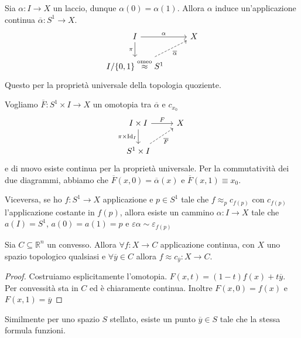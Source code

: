 \begin{proposition}
    Sia \(\alpha : I \to X\) un laccio, dunque \(\alpha{(0)} = \alpha{(1)}\).
    Allora \(\alpha\) induce un'applicazione continua \(\overline{\alpha} :
    S^{1} \to X\).
\[\begin{tikzcd}
	I & X \\
	{I/\{0,1\} \overset{\text{omeo}}{\approx} S^1}
	\arrow["\alpha", from=1-1, to=1-2]
	\arrow["\pi"', from=1-1, to=2-1]
	\arrow["{\overline{\alpha}}"', dashed, from=2-1, to=1-2]
\end{tikzcd}\]
Questo per la proprietà universale della topologia quoziente.

Vogliamo \(\overline{F} : S^{1}\times  I \to X\) un omotopia tra
\(\overline{\alpha}\) e \(c_{x_{0}} \) 
\[\begin{tikzcd}
	I \times I & X \\
	{S^1 \times I}
	\arrow["F", from=1-1, to=1-2]
	\arrow["\pi \times \mathrm{Id}_I"', from=1-1, to=2-1]
	\arrow["{\overline{F}}"', dashed, from=2-1, to=1-2]
\end{tikzcd}\]
e di nuovo esiste continua per la proprietà universale.
Per la commutatività dei due diagrammi, abbiamo che \(\overline{F}{(x, 0)} =
\overline{\alpha}{(x)}\) e \(\overline{F}{(x, 1)} \equiv x_{0}\).
\end{proposition}

\begin{proposition}
    Viceversa, 
    se ho \(f: S^{1} \to X\) applicazione e \(p \in S^{1}\) tale che \(f
    \approx_p c_{f{(p)}} \) con \(c_{f{(p)}} \) l'applicazione costante in
    \(f{(p)}\), allora esiste un cammino \(\alpha : I \to X\) tale che \(a{(I)}
    = S^{1}\), \(a{(0)}= a{(1)} = p\) e \(\varepsilon \alpha \sim
    \varepsilon_{f{(p)}} \) 
\end{proposition}

\begin{proposition}
    Sia \(C \subseteq \mathbb{R}^{n} \) un convesso. Allora \(\forall f : X \to
    C\) applicazione continua, con \(X\) uno spazio topologico qualsiasi e
    \(\forall \overline{y} \in C\) allora \(f \approx c_{\overline{y}}  : X \to
    C\). 
\end{proposition}
\begin{proof}
    Costruiamo esplicitamente l'omotopia. 
    \(F{(x, t)} = {(1-t)}f{(x)} + t\overline{y}\). Per convessità sta in \(C\)
    ed è chiaramente continua. Inoltre \(F{(x, 0)} = f{(x)}\) e \(F{(x, 1)} =
    \overline{y}\) 
\end{proof}
Similmente per uno spazio \(S\) stellato, esiste un punto \(\overline{y} \in S\)
tale che la stessa formula funzioni.

